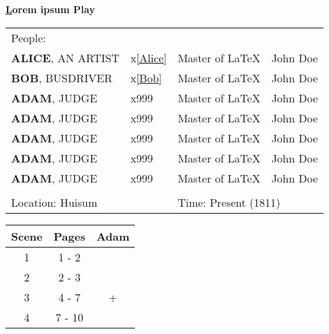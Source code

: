 \documentclass[10pt]{article}
\newcommand{\PlayTitle}{Lorem ipsum Play}
\newcommand{\TitlePageLineBold}[3]{\fontsize{#1}{#2}\selectfont \textbf{#3} \par}
\begin{document}
\begin{titlepage}
\begin{flushleft}
\TitlePageLineBold{26pt}{26pt}{\ul\PlayTitle}
\vspace{0.5cm}



\begin{table}[H] %
\begin{tabular}{p{4cm} p{5cm} p{3cm} p{2cm}}
People:& & & \\
\textbf{ALICE}, AN ARTIST & x\ref{Alice} & Master of LaTeX & John Doe \\
\textbf{BOB}, BUSDRIVER & x\ref{Bob} & Master of LaTeX & John Doe \\
\textbf{ADAM}, JUDGE & x999 & Master of LaTeX & John Doe \\
\textbf{ADAM}, JUDGE & x999 & Master of LaTeX & John Doe \\
\textbf{ADAM}, JUDGE & x999 & Master of LaTeX & John Doe \\
\textbf{ADAM}, JUDGE & x999 & Master of LaTeX & John Doe \\
\textbf{ADAM}, JUDGE & x999 & Master of LaTeX & John Doe \\
& & & \\
\multicolumn{2}{l}{Location: Huisum} &\multicolumn{2}{l}{Time: Present (1811)} \\

\end{tabular}
\end{table}


\begin{table}[H] %
\begin{tabular}{|c|c|c|}
\hline
Scene & Pages & Adam \\ \hline
1 & 1 - 2 & \cellcolor{TableColorAppearance} \\ \hline
2 & 2 - 3 & \\ \hline
3 & 4 - 7 & \cellcolor{TableColorSemiAppearance} + \\ \hline
4 & 7 - 10 & \\ \hline

\end{tabular}
\end{table}

\end{flushleft}
\end{titlepage}
\end{document}

